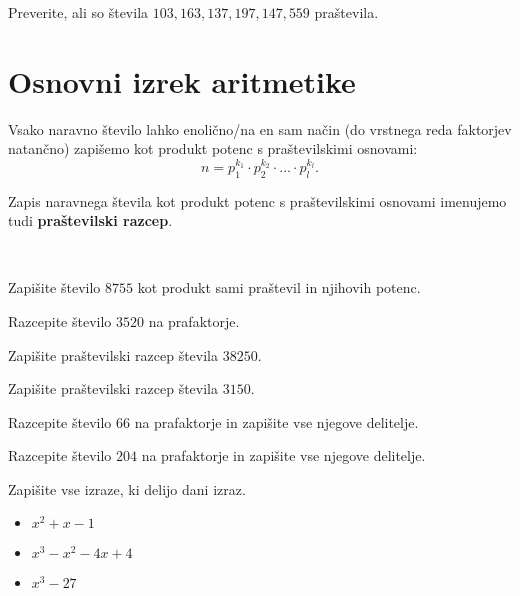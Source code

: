     
            

        \begin{naloga}
            Preverite, ali so števila $103, 163, 137, 197, 147, 559$ praštevila.
        \end{naloga}
            
    
    
    
\section{Osnovni izrek aritmetike}
    
    
        Vsako naravno število lahko enolično/na en sam način (do vrstnega reda faktorjev natančno) zapišemo kot produkt potenc s praštevilskimi osnovami:
        $$ n=p_1^{k_1}\cdot p_2^{k_2}\cdot\ldots\cdot p_l^{k_l}.$$

    

        Zapis naravnega števila kot produkt potenc s praštevilskimi osnovami imenujemo tudi \textbf{praštevilski razcep}.
                

        ~\\
        \begin{naloga}
            Zapišite število $8755$ kot produkt sami praštevil in njihovih potenc. 
        \end{naloga}

        \begin{naloga}
            Razcepite število $3520$ na prafaktorje. 
        \end{naloga}

        \begin{naloga}
            Zapišite praštevilski razcep števila $38250$. 
        \end{naloga}

        \begin{naloga}
            Zapišite praštevilski razcep števila $3150$. 
        \end{naloga}
    
        \begin{naloga}
            Razcepite število $66$ na prafaktorje in zapišite vse njegove delitelje. 
        \end{naloga}

        \begin{naloga}
            Razcepite število $204$ na prafaktorje in zapišite vse njegove delitelje. 
        \end{naloga}
    
        \begin{naloga}
            Zapišite vse izraze, ki delijo dani izraz.
            \begin{itemize}
                \item $x^2+x-1$ 
                \item $x^3-x^2-4x+4$ 
                \item $x^3-27$ 
            \end{itemize}
        \end{naloga}


